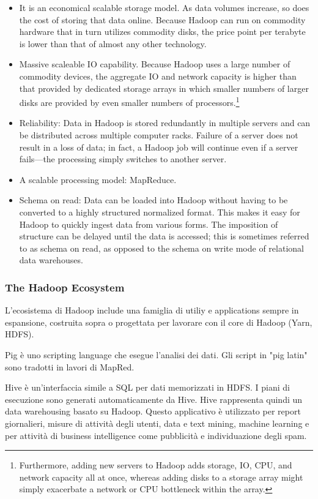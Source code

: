 \documentclass[a4page, 11pt]{article}
\begin{document}
\begin{itemize}

 \item It is an economical scalable storage model. As data volumes increase, so does the cost of storing that data online.
 Because Hadoop can run on commodity hardware that in turn utilizes commodity disks, the price point per terabyte is lower than that of almost any other technology.
\item Massive scaleable IO capability. Because Hadoop uses a large number of
commodity devices, the aggregate IO and network capacity is higher than that
provided by dedicated storage arrays in which smaller numbers of larger disks are provided by even smaller numbers of processors.\footnote{Furthermore, adding new servers to Hadoop adds storage, IO, CPU, and network capacity all at once, whereas adding disks to a storage array might simply exacerbate a network or CPU bottleneck within the array.}
\item Reliability: Data in Hadoop is stored redundantly in multiple servers and can be distributed across multiple computer racks. Failure of a server does not result in a loss of data; in fact, a Hadoop job will continue even if a server fails—the processing simply switches to another server.
\item A scalable processing model: MapReduce.
\item Schema on read: Data can be loaded into Hadoop without having to be converted
to a highly structured normalized format. This makes it easy for Hadoop to quickly ingest data from various forms. The imposition of structure can be delayed until the data is accessed; this is sometimes referred to as schema on read, as opposed to the schema on write mode of relational data warehouses.
\end{itemize}
\subsubsection{The Hadoop Ecosystem}
L'ecosistema di Hadoop include una famiglia di utiliy e applications sempre in espansione, costruita sopra o progettata per lavorare con il core di Hadoop (Yarn, HDFS).

Pig è uno scripting language che esegue l’analisi dei dati. Gli script in "pig latin" sono tradotti in lavori di MapRed. 

Hive è un’interfaccia simile a SQL per dati memorizzati in HDFS. I piani di esecuzione sono generati automaticamente da Hive. Hive rappresenta quindi un data warehousing basato su Hadoop. Questo applicativo è utilizzato per report giornalieri, misure di attività degli utenti, data e text mining, machine learning e per attività di business intelligence come pubblicità e individuazione degli spam.
\end{document}
